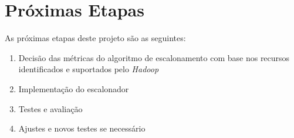 \chapter{Próximas Etapas}
As próximas etapas deste projeto são as seguintes:
\begin{enumerate}
   \item Decisão das métricas do algoritmo de escalonamento com base nos recursos identificados e suportados pelo \emph{Hadoop}
   \item Implementação do escalonador
   \item Testes e avaliação
   \item Ajustes e novos testes se necessário
\end{enumerate}
